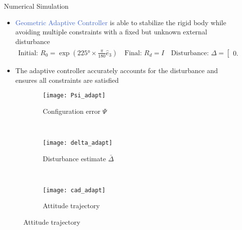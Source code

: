\documentclass[final, usenames, dvipsnames]{beamer}
\newlength{\onecolwidth}
\newlength{\twocolwidth}
\def\Emph{\textcolor{RoyalBlue}}
\begin{document}
\begin{frame}[t]
\begin{columns}[T,onlytextwidth]
\begin{column}{\twocolwidth}
\begin{block}{Numerical Simulation} %
	\begin{itemize}
		\item \Emph{Geometric Adaptive Controller} is able to stabilize the rigid body while avoiding multiple constraints with a fixed but unknown external disturbance
		\begin{align*}
			\text{Initial: } R_0 =  \exp(\ang{225} \times \frac{\pi}{180} \hat{e}_3) \quad \text{Final: } R_d = I \quad \text{Disturbance: } \Delta = \begin{bmatrix} 0.2 & 0.2 & 0.2 \end{bmatrix}^T
		\end{align*}
		\item The adaptive controller accurately accounts for the disturbance and ensures all constraints are satisfied
	\end{itemize}
	
	\begin{figure} 
    	\centering 
    	\begin{subfigure}[htbp]{0.3\columnwidth} 
    		\texttt{[image: Psi\_adapt]} 
    		\caption*{Configuration error \( \Psi \)} \label{fig:Psi_adapt} 
    	\end{subfigure}~
    	\begin{subfigure}[htbp]{0.3\columnwidth} 
    		\texttt{[image: delta\_adapt]} 
    		\caption*{Disturbance estimate \( \bar \Delta \)} \label{fig:delta_adapt} 
    	\end{subfigure}~
    	\begin{subfigure}[htbp]{0.3\columnwidth} 
    		\texttt{[image: cad\_adapt]} 
    		\caption*{Attitude trajectory} \label{fig:cad_adapt} 
    	\end{subfigure}
	\end{figure}
	\hfill
\end{block} %
\end{column}


\begin{column}{\onecolwidth} %


\end{column}
\end{columns}
\end{frame}
\end{document}
